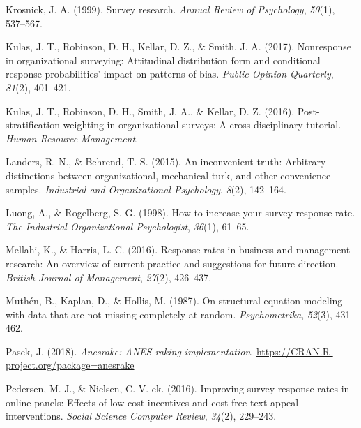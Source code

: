 \documentclass[
  man,mask]{apa7}
\newlength{\cslhangindent}
\newlength{\cslentryspacingunit} %
\newenvironment{CSLReferences}[2] %
 {%
  \setlength{\parindent}{0pt}
  \ifodd #1
  \let\oldpar\par
  \def\par{\hangindent=\cslhangindent\oldpar}
  \fi
  \setlength{\parskip}{#2\cslentryspacingunit}
 }%
 {}
\begin{document}
\begin{CSLReferences}{1}{0}
\leavevmode{}%
Krosnick, J. A. (1999). Survey research. \emph{Annual Review of Psychology}, \emph{50}(1), 537--567.

\leavevmode{}%
Kulas, J. T., Robinson, D. H., Kellar, D. Z., \& Smith, J. A. (2017). Nonresponse in organizational surveying: Attitudinal distribution form and conditional response probabilities' impact on patterns of bias. \emph{Public Opinion Quarterly}, \emph{81}(2), 401--421.

\leavevmode{}%
Kulas, J. T., Robinson, D. H., Smith, J. A., \& Kellar, D. Z. (2016). Post-stratification weighting in organizational surveys: A cross-disciplinary tutorial. \emph{Human Resource Management}.

\leavevmode{}%
Landers, R. N., \& Behrend, T. S. (2015). An inconvenient truth: Arbitrary distinctions between organizational, mechanical turk, and other convenience samples. \emph{Industrial and Organizational Psychology}, \emph{8}(2), 142--164.

\leavevmode{}%
Luong, A., \& Rogelberg, S. G. (1998). How to increase your survey response rate. \emph{The Industrial-Organizational Psychologist}, \emph{36}(1), 61--65.

\leavevmode{}%
Mellahi, K., \& Harris, L. C. (2016). Response rates in business and management research: An overview of current practice and suggestions for future direction. \emph{British Journal of Management}, \emph{27}(2), 426--437.

\leavevmode{}%
Muthén, B., Kaplan, D., \& Hollis, M. (1987). On structural equation modeling with data that are not missing completely at random. \emph{Psychometrika}, \emph{52}(3), 431--462.

\leavevmode{}%
Pasek, J. (2018). \emph{Anesrake: ANES raking implementation}. \url{https://CRAN.R-project.org/package=anesrake}

\leavevmode{}%
Pedersen, M. J., \& Nielsen, C. V. ek. (2016). Improving survey response rates in online panels: Effects of low-cost incentives and cost-free text appeal interventions. \emph{Social Science Computer Review}, \emph{34}(2), 229--243.


\end{CSLReferences}
\end{document}
